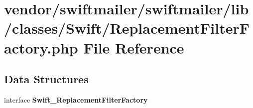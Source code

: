 \section{vendor/swiftmailer/swiftmailer/lib/classes/\+Swift/\+Replacement\+Filter\+Factory.php File Reference}
\label{_replacement_filter_factory_8php}
\subsection*{Data Structures}
\begin{DoxyCompactItemize}
\item 
interface {\bf Swift\+\_\+\+Replacement\+Filter\+Factory}
\end{DoxyCompactItemize}
